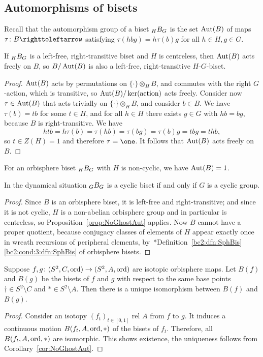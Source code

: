 \documentclass{amsart}
\begin{document}
\subsection{Automorphisms of bisets}
Recall that the automorphism group of a biset $\subscript H B_G$ is
the set $\operatorname{Aut}(B)$ of maps $\tau\colon B\selfmap$ satisfying
$\tau(h b g)=h\tau(b)g$ for all $h\in H,g\in G$.
\begin{prop}\label{prop:NoGhostAut}
  If $\subscript H B_G$ is a left-free, right-transitive biset and $H$
  is centreless, then $\operatorname{Aut}(B)$ acts freely on $B$, so $B/\operatorname{Aut}(B)$ is
  also a left-free, right-transitive $H$-$G$-biset.
\end{prop}
\begin{proof}
  $\operatorname{Aut}(B)$ acts by permutations on $\{\cdot\}\otimes_H B$, and
  commutes with the right $G$-action, which is transitive, so
  $\operatorname{Aut}(B)/\ker(\text{action})$ acts freely. Consider now
  $\tau\in\operatorname{Aut}(B)$ that acts trivially on $\{\cdot\}\otimes_H B$, and
  consider $b\in B$. We have $\tau(b)=t b$ for some $t\in H$, and for
  all $h\in H$ there exists $g\in G$ with $h b=b g$, because $B$ is
  right-transitive. We have
  \[h t b=h\tau(b)=\tau(h b)=\tau(b g)=\tau(b)g=t b g=t h b,
  \]
  so $t\in Z(H)=1$ and therefore $\tau=\one$. It follows that $\operatorname{Aut}(B)$
  acts freely on $B$.
\end{proof}
\begin{cor}\label{cor:NoGhostAut}
  For an orbisphere biset $\subscript H B_G$ with $H$ is non-cyclic,
  we have $\operatorname{Aut}(B)=1$.
\end{cor}
\noindent In the dynamical situation $\subscript G B_G$ is a cyclic
biset if and only if $G$ is a cyclic group.
\begin{proof}
  Since $B$ is an orbisphere biset, it is left-free and
  right-transitive; and since it is not cyclic, $H$ is a non-abelian
  orbisphere group and in particular is centreless, so
  Proposition~\ref{prop:NoGhostAut} applies. Now $B$ cannot have a
  proper quotient, because conjugacy classes of elements of $H$ appear
  exactly once in wreath recursions of peripheral elements,
  by~\cite{bartholdi-dudko:bc2}*{Definition~\ref{bc2:dfn:SphBis}\eqref{bc2:cond:3:dfn:SphBis}
    of orbisphere bisets}.
\end{proof}

\begin{cor}\label{cor:UniqBisIsom}
  Suppose $f,g\colon (S^2,C,\operatorname{ord})\to(S^2,A,\operatorname{ord})$ are isotopic
  orbisphere maps. Let $B(f)$ and $B(g)$ be the bisets of $f$ and
  $g$ with respect to the same base points $\dagger\in S^2\setminus C$
  and $*\in S^2\setminus A$. Then there is a unique isomorphism
  between $B(f)$ and $B(g)$.
\end{cor}
\begin{proof}
  Consider an isotopy $(f_t)_{t\in[0,1]}$ rel $A$ from $f$ to $g$. It
  induces a continuous motion $B(f_t,A,\operatorname{ord},*)$ of the bisets of
  $f_t$. Therefore, all $B(f_t,A,\operatorname{ord},*)$ are isomorphic. This shows
  existence, the uniqueness follows from Corollary~\ref{cor:NoGhostAut}.
\end{proof}
\end{document}
